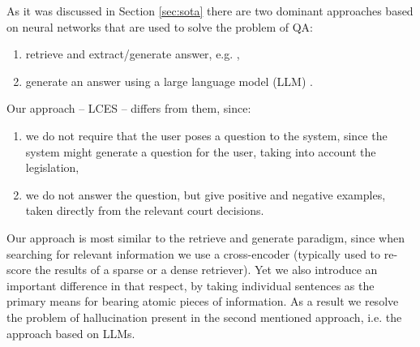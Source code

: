 As it was discussed in Section \ref{sec:sota} there are two dominant approaches 
based on neural networks that are used to solve the problem of QA:
\begin{enumerate}
  \item retrieve and extract/generate answer, e.g. \cite{}, %
  \item generate an answer using a large language model (LLM) \cite{}. %
\end{enumerate}
Our approach -- LCES -- differs from them, since:
\begin{enumerate}
  \item we do not require that the user poses a question to the system, since the system might generate a question for the user,
    taking into account the legislation,
  \item we do not answer the question, but give positive and negative examples, taken directly from the relevant court decisions.
\end{enumerate}
Our approach is most similar to the retrieve and generate paradigm, since when searching for relevant information we use
a cross-encoder (typically used to re-score the results of a sparse or a dense retriever). Yet we also introduce an important
difference in that respect, by taking individual sentences as the primary means for bearing atomic pieces of information.  
As a result we resolve the problem of hallucination present in the second mentioned approach, i.e. the approach based on LLMs.

